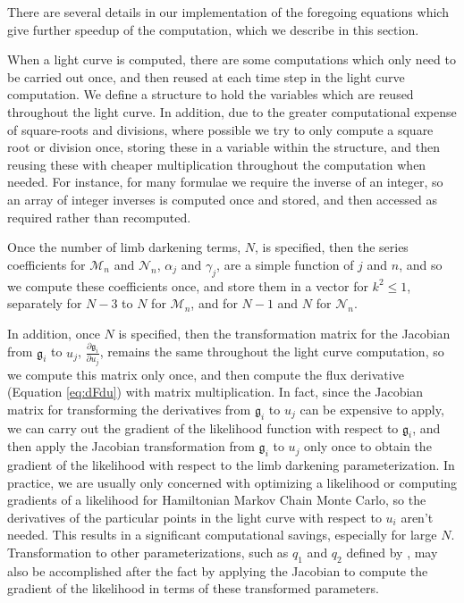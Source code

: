 \documentclass[modern]{aastex61}
\begin{document}
There are several details in our implementation of the foregoing equations
which give further speedup of the computation, which we describe in this
section.

When a light curve is computed, there are some computations which only
need to be carried out once, and then reused at each time step in the
light curve computation.  
We define a structure to hold the variables
which are reused throughout the light curve.  In addition, due to the greater 
computational expense of square-roots and divisions, where possible we try 
to only compute a square root or division once, storing these in a variable
within the structure, and then reusing these with cheaper multiplication 
throughout the computation when needed.  For instance, for many formulae we 
require the inverse of an integer, so an array of integer inverses is computed 
once and stored, and then accessed as required rather than recomputed.

Once the number of limb darkening
terms, $N$, is specified, then the series coefficients for $\mathcal{M}_n$
and $\mathcal{N}_n$, $\alpha_j$ and $\gamma_j$, are a simple function of $j$ 
and $n$, and so we compute these coefficients once, and store them in a vector 
for $k^2 \le 1$, separately for $N-3$ to $N$ for $\mathcal{M}_n$, and for 
$N-1$ and $N$ for $\mathcal{N}_n$.

In addition, once $N$ is specified, then the transformation matrix for
the Jacobian from $\mathfrak{g}_i$ to $u_j$, $\frac{\partial \mathfrak{g}_i}{\partial u_j}$,  
remains the same throughout the light curve 
computation, so we compute this matrix only once, and then compute the
flux derivative (Equation \ref{eq:dFdu}) with matrix multiplication.
In fact, since the Jacobian matrix for transforming the derivatives from $\mathfrak{g}_i$
to $u_j$ can be expensive to apply, we can carry out the gradient of the 
likelihood function with respect to $\mathfrak{g}_i$, and then apply the Jacobian 
transformation from $\mathfrak{g}_i$ to $u_j$ only once to obtain the gradient
of the likelihood with respect to the limb darkening parameterization.
In practice, we are usually only concerned with optimizing a likelihood
or computing gradients of a likelihood for Hamiltonian Markov Chain
Monte Carlo, so the derivatives of the particular points in the
light curve with respect to $u_i$ aren't needed.  This results in a
significant computational savings, especially for large $N$.
Transformation to other parameterizations, such as $q_1$ and $q_2$
defined by \citet{Kipping2013}, may also be accomplished after the
fact by applying the Jacobian to compute the gradient of the likelihood 
in terms of these transformed parameters.
\end{document}
